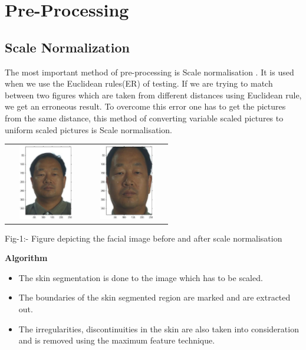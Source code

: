 \documentclass[final,3p,times,twocolumn,sort&compress]{elsarticle}
\begin{document}
\section{Pre-Processing}
\subsection{Scale Normalization}
\hspace{1cm} The most important method of pre-processing is Scale normalisation \cite{One} . It is used when we use the Euclidean rules(ER) of testing.
If we are trying to match between two figures which are taken from different distances using Euclidean rule, we get an erroneous result. To overcome this error one has to get the pictures from the same distance, this method of converting variable scaled pictures to uniform scaled pictures is Scale normalisation.
 \begin{table}[htbp]
  \begin{center}
  \begin{tabular}{cc}
  \includegraphics[width=3.3cm,height=3.3cm]{Scale1} &  \includegraphics[width=3.3cm,height=3.3cm]{Scale2} \\
     \end{tabular}
Fig-1:- Figure depicting the facial image before and after scale normalisation
 \end{center}
 \end{table}

\textbf{Algorithm}

\begin{itemize}
  \item The skin segmentation is done to the image which has to be scaled.
  \item The boundaries of the skin segmented region are marked and are extracted out.
  \item The irregularities, discontinuities in the skin are also taken into consideration and is removed using the maximum feature technique.
\end{itemize}
\end{document}
